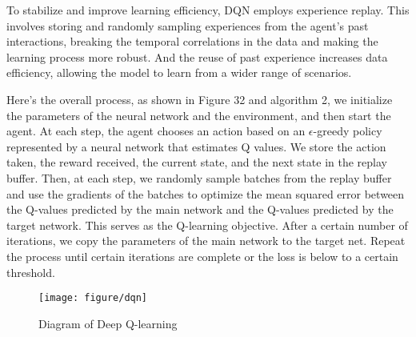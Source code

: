 \documentclass{article}
\begin{document}
To stabilize and improve learning efficiency, DQN employs experience replay. This involves storing and randomly sampling experiences from the agent's past interactions, breaking the temporal correlations in the data and making the learning process more robust. And the reuse of past experience increases data efficiency, allowing the model to learn from a wider range of scenarios.

Here's the overall process, as shown in Figure 32 and algorithm 2, we initialize the parameters of the neural network and the environment, and then start the agent. At each step, the agent chooses an action based on an $\epsilon$-greedy policy represented by a neural network that estimates Q values. We store the action taken, the reward received, the current state, and the next state in the replay buffer. Then, at each step, we randomly sample batches from the replay buffer and use the gradients of the batches to optimize the mean squared error between the Q-values predicted by the main network and the Q-values predicted by the target network. This serves as the Q-learning objective. After a certain number of iterations, we copy the parameters of the main network to the target net. Repeat the process until certain iterations are complete or the loss is below to a certain threshold.

\begin{figure}[htbp]
        \centering
        \texttt{[image: figure/dqn]}
        \caption{Diagram of Deep Q-learning}
\end{figure}

\hspace*{\fill}
\end{document}
